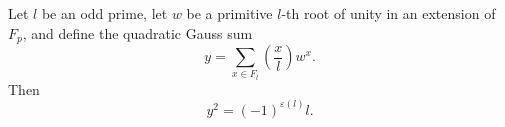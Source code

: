 Let $l$ be an odd prime, let $w$ be a primitive $l$-th root of unity in an extension of $F_p$, and define the quadratic Gauss sum
$$y = \sum_{x \in F_l} \left(\frac{x}{l}\right) w^x.$$
Then
$$y^2 = (-1)^{\varepsilon(l)} l.$$
